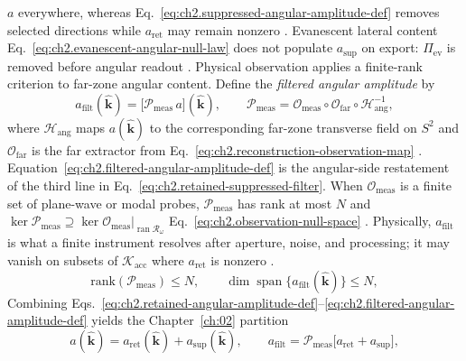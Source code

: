 \(a\) everywhere, whereas Eq.~\eqref{eq:ch2.suppressed-angular-amplitude-def} removes selected
directions while \(a_{\mathrm{ret}}\) may remain nonzero \cite{harrington2001}.
Evanescent lateral content Eq.~\eqref{eq:ch2.evanescent-angular-null-law} does not populate
\(a_{\mathrm{sup}}\) on export: \(\Pi_{\mathrm{ev}}\) is removed before angular readout
\cite{stratton1941}.
Physical observation applies a finite-rank criterion to far-zone angular content. Define the
\emph{filtered angular amplitude} by
\begin{equation}
\label{eq:ch2.filtered-angular-amplitude-def}
a_{\mathrm{filt}}(\widehat{\mathbf{k}})
=
\big[\mathcal{P}_{\mathrm{meas}}\,a\big](\widehat{\mathbf{k}}),
\qquad
\mathcal{P}_{\mathrm{meas}}
=
\mathcal{O}_{\mathrm{meas}}\circ\mathcal{O}_{\mathrm{far}}\circ\mathcal{H}_{\mathrm{ang}}^{-1},
\end{equation}
where \(\mathcal{H}_{\mathrm{ang}}\) maps \(a(\widehat{\mathbf{k}})\) to the corresponding
far-zone transverse field on \(S^{2}\) and \(\mathcal{O}_{\mathrm{far}}\) is the far extractor
from Eq.~\eqref{eq:ch2.reconstruction-observation-map} \cite{stratton1941}.
Equation~\eqref{eq:ch2.filtered-angular-amplitude-def} is the angular-side restatement of the
third line in Eq.~\eqref{eq:ch2.retained-suppressed-filter}. When
\(\mathcal{O}_{\mathrm{meas}}\) is a finite set of plane-wave or modal probes,
\(\mathcal{P}_{\mathrm{meas}}\) has rank at most \(N\) and
\(\ker\mathcal{P}_{\mathrm{meas}}\supseteq\ker\mathcal{O}_{\mathrm{meas}}\big|_{\operatorname{ran}\mathcal{R}_\omega}\)
Eq.~\eqref{eq:ch2.observation-null-space} \cite{stratton1941}. Physically,
\(a_{\mathrm{filt}}\) is what a finite instrument resolves after aperture, noise, and processing;
it may vanish on subsets of \(\mathcal{K}_{\mathrm{acc}}\) where \(a_{\mathrm{ret}}\) is nonzero
\cite{harrington2001}.
\begin{equation}
\label{eq:ch2.filtered-rank-bound}
\mathrm{rank}(\mathcal{P}_{\mathrm{meas}})
\le
N,
\qquad
\dim\operatorname{span}\{a_{\mathrm{filt}}(\widehat{\mathbf{k}})\}
\le
N,
\end{equation}
Combining Eqs.~\eqref{eq:ch2.retained-angular-amplitude-def}--\eqref{eq:ch2.filtered-angular-amplitude-def}
yields the Chapter~\ref{ch:02} partition
\begin{equation}
\label{eq:ch2.angular-component-partition}
a(\widehat{\mathbf{k}})
=
a_{\mathrm{ret}}(\widehat{\mathbf{k}})
+
a_{\mathrm{sup}}(\widehat{\mathbf{k}}),
\qquad
a_{\mathrm{filt}}
=
\mathcal{P}_{\mathrm{meas}}\big[a_{\mathrm{ret}}+a_{\mathrm{sup}}\big],
\end{equation}
